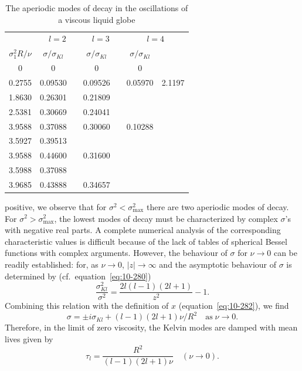 \begin{table}[ht]
\centering
\caption{The aperiodic modes of decay in the oscillations of a viscous liquid globe}
\label{tab:LI}
\small
\begin{tabular}{c|cc|cc|cc}
\hline
& \multicolumn{2}{c|}{$l = 2$} & \multicolumn{2}{c|}{$l = 3$} & \multicolumn{2}{c}{$l = 4$} \\
$\sigma_1^2 R/\nu$ & $\sigma/\sigma_{Kl}$ & & $\sigma/\sigma_{Kl}$ & & $\sigma/\sigma_{Kl}$ & \\
\hline
0 & 0 & & 0 & & 0 & \\
0.2755 & 0.09530 & & 0.09526 & & 0.05970 & 2.1197 \\
1.8630 & 0.26301 & & 0.21809 & & & \\
2.5381 & 0.30669 & & 0.24041 & & & \\
3.9588 & 0.37088 & & 0.30060 & & 0.10288 & \\
3.5927 & 0.39513 & & & & & \\
3.9588 & 0.44600 & & 0.31600 & & & \\
3.5988 & 0.37088 & & & & & \\
3.9685 & 0.43888 & & 0.34657 & & & \\
\hline
\end{tabular}
\end{table}


positive, we observe that for $\sigma^2 < \sigma_{\max}^2$ there are two aperiodic modes of decay. For $\sigma^2 > \sigma_{\max}^2$, the lowest modes of decay must be characterized by complex $\sigma$'s with negative real parts. A complete numerical analysis of the corresponding characteristic values is difficult because of the lack of tables of spherical Bessel functions with complex arguments. However, the behaviour of $\sigma$ for $\nu \to 0$ can be readily established: for, as $\nu \to 0$, $|z| \to \infty$ and the asymptotic behaviour of $\sigma$ is determined by (cf.\ equation~\eqref{eq:10-280})
\begin{equation}
\label{eq:10-289}
\frac{\sigma_{Kl}^2}{\sigma^2} = \frac{2l(l-1)(2l+1)}{z^2}-1.
\end{equation}
Combining this relation with the definition of $x$ (equation~\eqref{eq:10-282}), we find
\begin{equation}
\label{eq:10-290}
\sigma = \pm i\sigma_{Kl}+(l-1)(2l+1)\nu/R^2 \quad\text{as}\;\nu \to 0.
\end{equation}
Therefore, in the limit of zero viscosity, the Kelvin modes are damped with mean lives given by
\begin{equation}
\label{eq:10-291}
\tau_l = \frac{R^2}{(l-1)(2l+1)\nu} \quad (\nu \to 0).
\end{equation}

